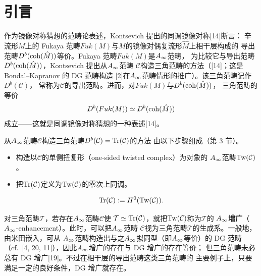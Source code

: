 
\section{引言}
\label{sec:intro}

作为镜像对称猜想的范畴论表述，Kontsevich 提出的同调镜像对称[14]断言：
辛流形$M$上的 Fukaya 范畴$Fuk(M)$与$M$的镜像对偶复流形$\hat{M}$上相干层构成的
导出范畴$D^{b}(\operatorname{coh}(\hat{M}))$等价。Fukaya 范畴$Fuk(M)$是$A_{\infty}$范畴，
为比较它与导出范畴$D^{b}(\operatorname{coh}(\hat{M}))$，Kontsevich 提出从$A_{\infty}$范畴
$\mathcal{C}$构造三角范畴的方法（[14]；这是 Bondal--Kapranov 的 DG 范畴构造
[2]在$A_{\infty}$范畴情形的推广）。该三角范畴记作$D^{b}(\mathcal{C})$，
常称为$\mathcal{C}$的导出范畴。进而，对$Fuk(M)$与$D^{b}(\operatorname{coh}(\hat{M}))$，
三角范畴的等价
\begin{equation}
  D^{b}(Fuk(M)) \simeq D^{b}(\operatorname{coh}(\hat{M}))
  \label{eq:c00-1}
\end{equation}
成立——这就是同调镜像对称猜想的一种表述[14]。


从$A_{\infty}$范畴$\mathcal{C}$构造三角范畴$D^{b}(\mathcal{C})=\operatorname{Tr}(\mathcal{C})$的方法
由以下步骤组成（第 3 节）。

\begin{itemize}[leftmargin=2em,itemsep=2pt,topsep=4pt]
  \item 构造以$\mathcal{C}$的单侧扭复形（one-sided twisted complex）为对象的
        $A_{\infty}$范畴$\operatorname{Tw}(\mathcal{C})$。
  \item 把$\operatorname{Tr}(\mathcal{C})$定义为$\operatorname{Tw}(\mathcal{C})$的零次上同调。
\end{itemize}
\[
  \operatorname{Tr}(\mathcal{C}) := H^{0}(\operatorname{Tw}(\mathcal{C})).
\]

对三角范畴$\mathcal{T}$，若存在$A_{\infty}$范畴$\mathcal{C}$使
$\mathcal{T}\simeq\operatorname{Tr}(\mathcal{C})$，就把$\operatorname{Tw}(\mathcal{C})$称为$\mathcal{T}$的
\textbf{$A_{\infty}$增广}（\mbox{$A_{\infty}$-enhancement}）。此时，可以把$A_{\infty}$范畴
$\mathcal{C}$视为三角范畴$\mathcal{T}$的生成系。一般地，由米田嵌入，可从
$A_{\infty}$范畴构造出与之$A_{\infty}$拟同型（即$A_{\infty}$等价）的 DG 范畴
（cf.\ [4, 20, 11]），因此$A_{\infty}$增广的存在与 DG 增广的存在等价；
但三角范畴未必总有 DG 增广[19]。不过在相干层的导出范畴这类三角范畴的
主要例子上，只要满足一定的良好条件，DG 增广就存在。

